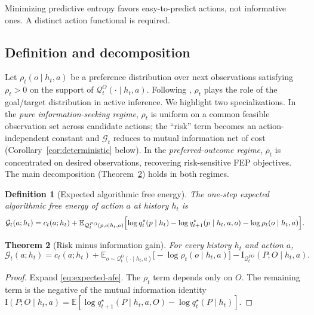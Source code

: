 \documentclass[11pt]{article}
\newtheorem{definition}{Definition}[section]
\newtheorem{theorem}[definition]{Theorem}
\theoremstyle{remark}
\newcommand{\Gcal}{\mathcal{G}}
\newcommand{\Qcal}{\mathcal{Q}}
\newcommand{\E}{\mathbb{E}}
\newcommand{\I}{\mathrm{I}}
\begin{document}
Minimizing predictive entropy favors easy-to-predict actions, not informative ones. A distinct action functional is required.

\subsection{Definition and decomposition}

Let \(\rho_t(o\mid h_t,a)\) be a preference distribution over next observations satisfying \(\rho_t > 0\) on the support of \(\Qcal_t^O(\cdot\mid h_t,a)\). Following \citet{ParrFriston2019}, \(\rho_t\) plays the role of the goal/target distribution in active inference. We highlight two specializations. In the \emph{pure information-seeking regime}, \(\rho_t\) is uniform on a common feasible observation set across candidate actions; the ``risk'' term becomes an action-independent constant and \(\Gcal_t\) reduces to mutual information net of cost (Corollary~\ref{cor:deterministic} below). In the \emph{preferred-outcome regime}, \(\rho_t\) is concentrated on desired observations, recovering risk-sensitive FEP objectives. The main decomposition (Theorem~\ref{thm:risk-minus-ig}) holds in both regimes.

\begin{definition}[Expected algorithmic free energy]
The one-step expected algorithmic free energy of action \(a\) at history \(h_t\) is
\begin{equation}
\Gcal_t(a;h_t)
= c_t(a;h_t)
+ \E_{\Qcal_t^{PO}(p,o\mid h_t,a)}
\Bigl[
\log q_t^\star(p\mid h_t)
- \log q_{t+1}^\star(p\mid h_t,a,o)
- \log \rho_t(o\mid h_t,a)
\Bigr].
\label{eq:expected-afe}
\end{equation}
\end{definition}

\begin{theorem}[Risk minus information gain]
\label{thm:risk-minus-ig}
For every history \(h_t\) and action \(a\),
\begin{equation}
\Gcal_t(a;h_t)
= c_t(a;h_t)
+ \E_{o\sim \Qcal_t^O(\cdot\mid h_t,a)}
\bigl[-\log \rho_t(o\mid h_t,a)\bigr]
- \I_{\Qcal_t^{PO}}(P;O\mid h_t,a).
\label{eq:risk-minus-ig}
\end{equation}
\end{theorem}

\begin{proof}
Expand \eqref{eq:expected-afe}. The \(\rho_t\) term depends only on \(O\). The remaining term is the negative of the mutual information identity \(\I(P;O\mid h_t,a) = \E[\log q_{t+1}^\star(P\mid h_t,a,O) - \log q_t^\star(P\mid h_t)]\).
\end{proof}
\end{document}
